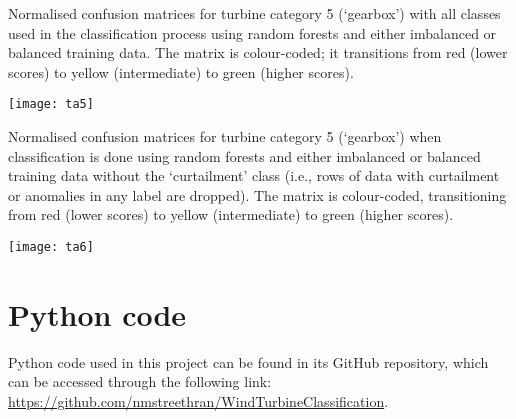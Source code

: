 \begin{table}
  \centering
  \captionsetup{labelformat=empty,list=no}
  \caption{Normalised confusion matrices for turbine category 5 (`gearbox') with all classes used in the classification process using random forests and either imbalanced or balanced training data. The matrix is colour-coded; it transitions from red (lower scores) to yellow (intermediate) to green (higher scores).}
  \texttt{[image: ta5]}
\end{table}

\begin{table}
  \centering
  \captionsetup{labelformat=empty,list=no}
  \caption{Normalised confusion matrices for turbine category 5 (`gearbox') when classification is done using random forests and either imbalanced or balanced training data without the `curtailment' class (i.e., rows of data with curtailment or anomalies in any label are dropped). The matrix is colour-coded, transitioning from red (lower scores) to yellow (intermediate) to green (higher scores).}
  \texttt{[image: ta6]}
\end{table}

\chapter{Python code}\label{a5}

Python code used in this project can be found in its GitHub repository, which can be accessed through the following link: \url{https://github.com/nmstreethran/WindTurbineClassification}.
